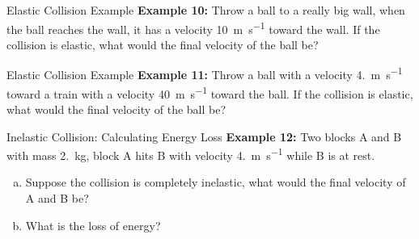 \documentclass[12pt,compress,aspectratio=169]{beamer}
\begin{document}
\begin{frame}{Elastic Collision Example}
  \textbf{Example 10:} Throw a ball to a really big wall, when the ball reaches
  the wall, it has a velocity \SI{10}{\metre\per\second} toward the wall. If
  the collision is elastic, what would the final velocity of the ball be?
\end{frame}



\begin{frame}{Elastic Collision Example}
  \textbf{Example 11:} Throw a ball with a velocity \SI{4.}{\metre\per\second}
  toward a train with a velocity \SI{40}{\metre\per\second} toward the ball.
  If the collision is elastic, what would the final velocity of the ball be?
\end{frame}


\begin{frame}{Inelastic Collision: Calculating Energy Loss}
  \textbf{Example 12:} Two blocks A and B with mass \SI{2.}{\kilo\gram}, block
  A hits B with velocity \SI{4.}{\metre\per\second} while B is at rest.
  \begin{enumerate}[(a)]
  \item Suppose the collision is completely inelastic, what would the final
    velocity of A and B be?
  \item What is the loss of energy?
  \end{enumerate}
\end{frame}
\end{document}
